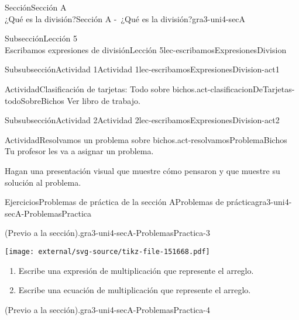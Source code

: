 \begin{sectionptx}{Sección}{{\Large Sección A\\}¿Qué es la división?}{}{Sección A -~¿Qué es la división?}{}{}{gra3-uni4-secA}
\begin{subsectionptx}{Subsección}{{\normalsize Lección 5\\[-0.05cm]}Escribamos expresiones de división}{}{Lección 5}{}{}{lec-escribamosExpresionesDivision}
\begin{subsubsectionptx}{Subsubsección}{Actividad 1}{}{Actividad 1}{}{}{lec-escribamosExpresionesDivision-act1}
\begin{activity}{Actividad}{Clasificación de tarjetas: Todo sobre bichos.}{act-clasificacionDeTarjetas-todoSobreBichos}
Ver libro de trabajo.
\end{activity}%
%
\end{subsubsectionptx}
%
%
\typeout{************************************************}
\typeout{************************************************}
%
\begin{subsubsectionptx}{Subsubsección}{Actividad 2}{}{Actividad 2}{}{}{lec-escribamosExpresionesDivision-act2}
\begin{activity}{Actividad}{Resolvamos un problema sobre bichos.}{act-resolvamosProblemaBichos}%
Tu profesor les va a asignar un problema.%
\par
Hagan una presentación visual que muestre cómo pensaron y que muestre su solución al problema.%
\end{activity}%
\end{subsubsectionptx}
\end{subsectionptx}
%
%
\typeout{************************************************}
\typeout{************************************************}
%
\begin{exercises-subsection}{Ejercicios}{Problemas de práctica de la sección A}{}{Problemas de práctica}{}{}{gra3-uni4-secA-ProblemasPractica}
\begin{divisionexercise}{1}{(Previo a la sección).}{}{gra3-uni4-secA-ProblemasPractica-3}%
\begin{sidebyside}{2}{0}{0}{0}%
\begin{sbspanel}{0.3}%
\texttt{[image: external/svg-source/tikz-file-151668.pdf]}
\end{sbspanel}%
\begin{sbspanel}{0.7}%
%
\begin{enumerate}[label={(\alph*)}]
\item{}Escribe una expresión de multiplicación que represente el arreglo.%
\item{}Escribe una ecuación de multiplicación que represente el arreglo.%
\end{enumerate}
%
\end{sbspanel}%
\end{sidebyside}%
\end{divisionexercise}%
\begin{divisionexercise}{2}{(Previo a la sección).}{}{gra3-uni4-secA-ProblemasPractica-4}%

\end{divisionexercise}
\end{exercises-subsection}
\end{sectionptx}
